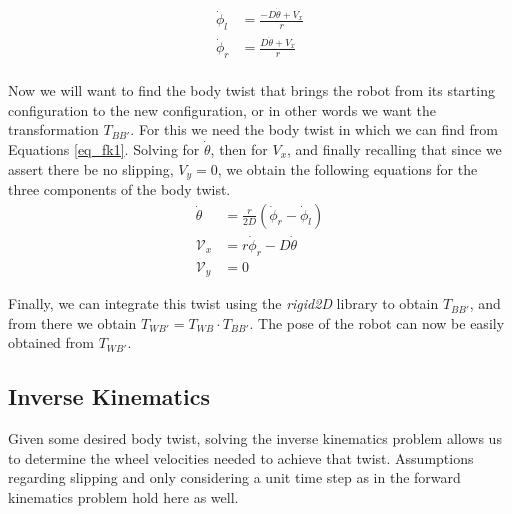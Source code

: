 \documentclass{article}
\begin{document}
\begin{equation} \label{eq_fk1}
   \begin{split}
      \dot \phi_l & = \frac{-D \dot \theta + V_x}{r} \\
      \dot \phi_r & = \frac{D \dot \theta + V_x}{r} \\
   \end{split}
\end{equation}

\noindent
Now we will want to find the body twist that brings the robot
from its starting configuration to the new configuration, or in
other words we want the transformation $T_{BB'}$. For this we need
the body twist in which we can find from Equations \ref{eq_fk1}.
Solving for $\dot \theta$, then for $V_x$, and finally recalling
that since we assert there be no slipping, $V_y = 0$, we obtain
the following equations for the three components of the body twist.
\begin{equation}
   \begin{split}
      \dot \theta & = \frac{r}{2D} \left(\dot \phi_r - \dot \phi_l\right) \\[10pt]
      \mathcal{V}_x & = r \dot \phi_r - D \dot \theta \\[10pt]
      \mathcal{V}_y & = 0
   \end{split}
\end{equation}

\noindent
Finally, we can integrate this twist using the \emph{rigid2D} library
to obtain $T_{BB'}$, and from there we obtain $T_{WB'} = T_{WB} \cdot T_{BB'}$.
The pose of the robot can now be easily obtained from $T_{WB'}$.

\subsection*{Inverse Kinematics}
Given some desired body twist, solving the inverse kinematics problem
allows us to determine the wheel velocities needed to achieve that twist.
Assumptions regarding slipping and only considering a unit time step as in
the forward kinematics problem hold here as well.
\end{document}
